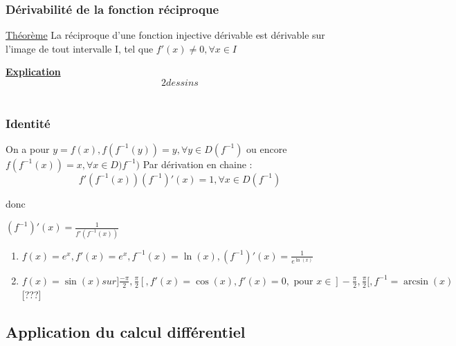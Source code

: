 \documentclass[12pt,a4paper]{article}
\newcommand{\evid}[1]{\textbf{\underline{#1}}}
\newcommand{\pour}{\mbox{ pour }}
\newcommand{\Theoreme}{\underline{Théorème} }
\begin{document}
{\subsubsection{Dérivabilité de la fonction réciproque}
\begin{boite}
	\Theoreme La réciproque d'une fonction injective dérivable est dérivable sur l'image de tout intervalle I, tel que $f'(x) \neq 0, \forall x \in I$
\end{boite}
\evid{Explication}
\[2 dessins\]\\
\subsubsection{Identité}
On a pour $y = f(x), f(f^{-1}(y)) = y, \forall y \in D(f^{-1})$ ou encore $f(f^{-1}(x)) = x, \forall x \in D)f^{-1})$
Par dérivation en chaine :
\begin{equation}
f'(f^{-1}(x))(f^{-1})'(x) = 1, \forall x \in D(f^{-1})
\end{equation}

donc 
\begin{boite}
$(f^{-1})'(x) = \frac{1}{f'(f^{-1}(x))}$
\end{boite}

\begin{enumerate}[label=\roman*]
	\item $f(x) = e^x, f'(x)= e^x, f^{-1}(x) = \ln(x), (f^{-1})'(x) = \frac{1}{e^{\ln(x)}}$
	\item $f(x) = \sin(x) sur ]\frac{-\pi}{2},\frac{\pi}{2}[, f'(x) = \cos(x), f'(x) = 0, \pour x \in ]-\frac{\pi}{2}, \frac{\pi}{2}[, f^{-1} = \arcsin(x)$ [???]
\end{enumerate}
\subsection{Application du calcul différentiel}
}
\end{document}
